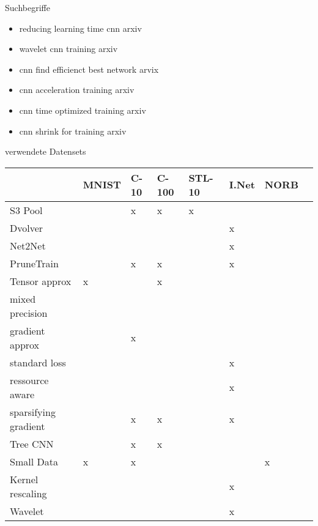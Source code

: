 \documentclass[10pt]{beamer}
\begin{document}
\begin{frame}{Suchbegriffe}
 \begin{itemize}
  \item reducing learning time cnn arxiv 
  \item wavelet cnn training arxiv
  \item cnn find efficienct best network arvix
  \item cnn acceleration training arxiv
  \item cnn time optimized training arxiv
  \item cnn shrink for training arxiv
 \end{itemize}

\end{frame}

\begin{frame}{verwendete Datensets}
 \begin{table}[]
\begin{tabular}{|l|l|l|l|l|l|l|l|}
                     & MNIST & C-10 & C-100 & STL- 10 & I.Net & NORB \\\hline
S3 Pool              &       & x        & x         & x       &          &      \\\hline
Dvolver              &       &          &           &         & x        &      \\\hline
Net2Net              &       &          &           &         & x        &      \\ \hline
PruneTrain           &       & x        & x         &         & x        &      \\\hline
Tensor approx        & x     &          & x         &         &          &      \\\hline
mixed precision      &       &          &           &         &          &      \\\hline
gradient approx      &       & x        &           &         &          &      \\\hline
standard loss        &       &          &           &         & x        &      \\\hline
ressource aware      &       &          &           &         & x        &      \\\hline
sparsifying gradient &       & x        & x         &         & x        &      \\\hline
Tree CNN             &       & x        & x         &         &          &      \\\hline
Small Data           & x     & x        &           &         &          & x    \\\hline
Kernel rescaling     &       &          &           &         & x        &      \\ \hline
Wavelet              &       &          &           &         & x \\ \hline
\end{tabular}
\end{table}
\end{frame}
\end{document}
